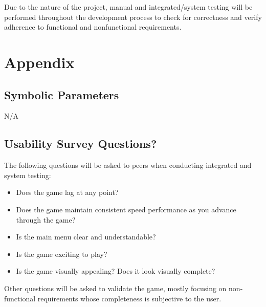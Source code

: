 \documentclass[12pt, titlepage]{article}
\begin{document}
Due to the nature of the project, manual and integrated/system testing will be performed throughout the development process to check for correctness and verify adherence to functional and nonfunctional requirements.


\newpage

\section{Appendix}

\subsection{Symbolic Parameters}

N/A

\subsection{Usability Survey Questions?}

The following questions will be asked to peers when conducting integrated and system testing:
\begin{itemize}
\item Does the game lag at any point?
\item Does the game maintain consistent speed performance as you advance through the game?
\item Is the main menu clear and understandable?
\item Is the game exciting to play?
\item Is the game visually appealing? Does it look visually complete?
\end{itemize}
Other questions will be asked to validate the game, mostly focusing on non-functional requirements whose completeness is subjective to the user.
\end{document}
